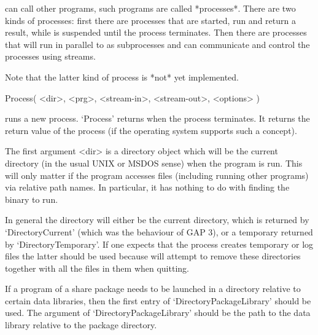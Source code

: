 


{\GAP}  can  call other programs,  such  programs are called *processes*.
There are  two  kinds of processes:  first there  are  processes that are
started, run and  return a result,  while  {\GAP} is suspended  until the
process  terminates.  Then there are  processes that will run in parallel
to {\GAP} as  subprocesses  and {\GAP} can  communicate and   control the
processes using streams.

Note that the latter kind of process is *not* yet implemented.


\>Process( <dir>, <prg>, <stream-in>, <stream-out>, <options> )

runs  a new process.  `Process' returns  when the process terminates.  It
returns the return value of the process (if the operating system supports
such a concept).

The first argument <dir> is a directory object which  will be the current
directory (in the usual UNIX  or MSDOS sense) when   the program is  run.
This will  only matter if  the program accesses  files (including running
other programs)  via relative path names.   In particular, it has nothing
to do with finding the binary to run.

In general the  directory will either  be the current directory, which is
returned by `DirectoryCurrent'  (which was the behaviour  of GAP 3), or a
temporary returned  by  `DirectoryTemporary'.  If  one  expects  that the
process creates temporary or log files the latter  should be used because
{\GAP} will attempt  to remove these  directories  together with all  the
files in them when quitting.

If  a program of a  share  package needs  to be  launched  in a directory
relative  to  certain  data    libraries,   then  the first     entry  of
`DirectoryPackageLibrary'    should  be   used.     The     argument   of
`DirectoryPackageLibrary' should be the path to the data library relative
to the package directory.

